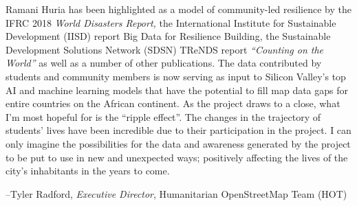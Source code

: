 \documentclass[a4paper,12pt,twoside]{article}
\begin{document}
\begin{multicols}{2}
Ramani Huria has been highlighted as a model of community-led resilience by the IFRC 2018 \textit{World Disasters Report,} the International Institute for Sustainable Development (IISD) report Big Data for Resilience Building, the Sustainable Development Solutions Network (SDSN) TReNDS report \textit{“Counting on the World”} as well as a number of other publications. The data contributed by students and community members is now serving as input to Silicon Valley’s top AI and machine learning models that have the potential to fill map data gaps for entire countries on the African continent. As the project draws to a close, what I’m most hopeful for is the “ripple effect”. The changes in the trajectory of students’ lives have been incredible due to their participation in the project. I can only imagine the possibilities for the data and awareness generated by the project to be put to use in new and unexpected ways; positively affecting the lives of the city’s inhabitants in the years to come.

\end{multicols}

--Tyler Radford, \textit{Executive Director}, Humanitarian OpenStreetMap Team (HOT)
\clearpage

\newpage
\end{document}
